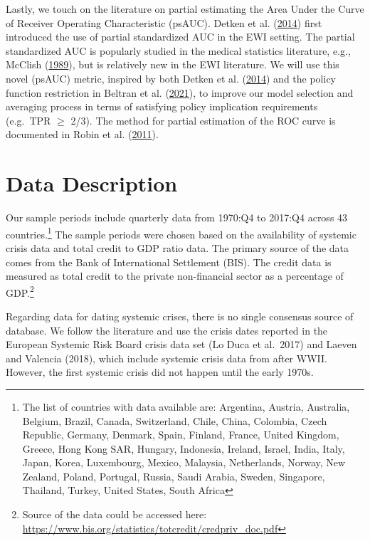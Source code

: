 \documentclass[
  12pt,
]{article}
\begin{document}
Lastly, we touch on the literature on partial estimating the Area Under the Curve of Receiver Operating Characteristic (psAUC). Detken et al. (\protect\hyperlink{ref-detken_operationalising_2014}{2014}) first introduced the use of partial standardized AUC in the EWI setting. The partial standardized AUC is popularly studied in the medical statistics literature, e.g., McClish (\protect\hyperlink{ref-mcclish_analyzing_1989}{1989}), but is relatively new in the EWI literature. We will use this novel (psAUC) metric, inspired by both Detken et al. (\protect\hyperlink{ref-detken_operationalising_2014}{2014}) and the policy function restriction in Beltran et al. (\protect\hyperlink{ref-beltran_optimizing_2021}{2021}), to improve our model selection and averaging process in terms of satisfying policy implication requirements (e.g.~TPR \(\ge\) 2/3). The method for partial estimation of the ROC curve is documented in Robin et al. (\protect\hyperlink{ref-robin_proc_2011}{2011}).

\hypertarget{data-description}{%
\section{Data Description}\label{data-description}}

Our sample periods include quarterly data from 1970:Q4 to 2017:Q4 across 43 countries.\footnote{The list of countries with data available are: Argentina, Austria, Australia, Belgium, Brazil, Canada, Switzerland, Chile, China, Colombia, Czech Republic, Germany, Denmark, Spain, Finland, France, United Kingdom, Greece, Hong Kong SAR, Hungary, Indonesia, Ireland, Israel, India, Italy, Japan, Korea, Luxembourg, Mexico, Malaysia, Netherlands, Norway, New Zealand, Poland, Portugal, Russia, Saudi Arabia, Sweden, Singapore, Thailand, Turkey, United States, South Africa} The sample periods were chosen based on the availability of systemic crisis data and total credit to GDP ratio data. The primary source of the data comes from the Bank of International Settlement (BIS). The credit data is measured as total credit to the private non-financial sector as a percentage of GDP.\footnote{Source of the data could be accessed here: \url{https://www.bis.org/statistics/totcredit/credpriv_doc.pdf}}

Regarding data for dating systemic crises, there is no single consensus source of database. We follow the literature and use the crisis dates reported in the European Systemic Risk Board crisis data set (Lo Duca et al.~2017) and Laeven and Valencia (2018), which include systemic crisis data from after WWII. However, the first systemic crisis did not happen until the early 1970s.
\end{document}
